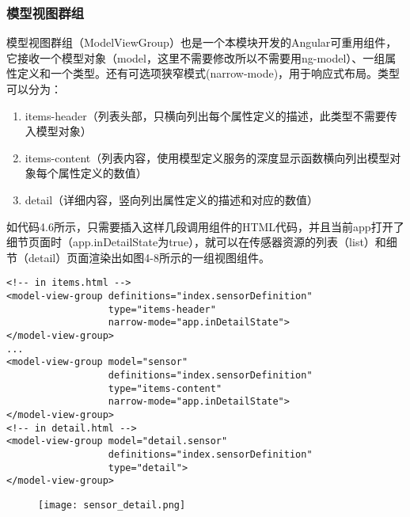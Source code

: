 \subsubsection{模型视图群组}
模型视图群组（ModelViewGroup）也是一个本模块开发的Angular可重用组件，它接收一个模型对象（model，这里不需要修改所以不需要用ng-model）、一组属性定义和一个类型。还有可选项狭窄模式(narrow-mode)，用于响应式布局。类型可以分为：
\begin{enumerate}
  \item items-header（列表头部，只横向列出每个属性定义的描述，此类型不需要传入模型对象）
  \item items-content（列表内容，使用模型定义服务的深度显示函数横向列出模型对象每个属性定义的数值）
  \item detail（详细内容，竖向列出属性定义的描述和对应的数值）
\end{enumerate}
如代码4.6所示，只需要插入这样几段调用组件的HTML代码，并且当前app打开了细节页面时（app.inDetailState为true），就可以在传感器资源的列表（list）和细节（detail）页面渲染出如图4-8所示的一组视图组件。
\begin{lstlisting}[language={HTML5}, caption={传感器列表页面中的模型输入群组代码}]
<!-- in items.html -->
<model-view-group definitions="index.sensorDefinition"
                  type="items-header"
                  narrow-mode="app.inDetailState">
</model-view-group>
...
<model-view-group model="sensor"
                  definitions="index.sensorDefinition"
                  type="items-content"
                  narrow-mode="app.inDetailState">
</model-view-group>
<!-- in detail.html -->
<model-view-group model="detail.sensor"
                  definitions="index.sensorDefinition"
                  type="detail">
</model-view-group>
\end{lstlisting}
\begin{figure}[!htp]
 \centering
 \texttt{[image: sensor\_detail.png]}
\end{figure}
